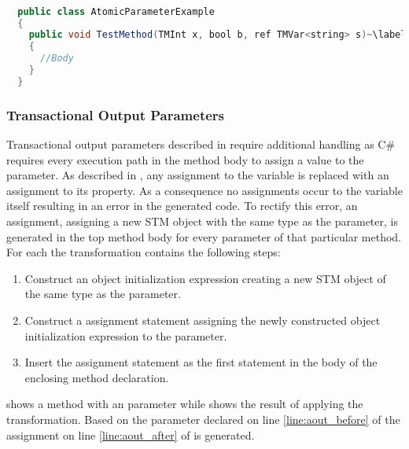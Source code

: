 \begin{lstlisting}[label=lst:after_atomic_parameter,
  caption={\bscode{atomic} Parameters After Transformation},
  language=Java,  
  showspaces=false,
  showtabs=false,
  breaklines=true,
  showstringspaces=false,
  breakatwhitespace=true,
  escapechar=~,
  commentstyle=\color{greencomments},
  keywordstyle=\color{bluekeywords},
  stringstyle=\color{redstrings},
  morekeywords={atomic, retry, orelse, var, get, set, ref}]  % Start your code-block

  public class AtomicParameterExample
  {
    public void TestMethod(TMInt x, bool b, ref TMVar<string> s)~\label{line:ap_after}~
    {
      //Body
    }
  }
\end{lstlisting}

\subsubsection{Transactional Output Parameters}
Transactional output parameters described in  require additional handling as C\# requires every execution path in the method body to assign a value to the parameter\cite[p. 42]{sestoft2011c}. As described in , any assignment to the variable is replaced with an assignment to its  property. As a consequence no assignments occur to the variable itself resulting in an error in the generated code. To rectify this error, an assignment, assigning a new \ac{STM} object with the same type as the parameter, is generated in the top method body for every  parameter of that particular method. For each  the \stmnamesp transformation contains the following steps:

\begin{enumerate}
	\item Construct an object initialization expression creating a new \ac{STM} object of the same type as the parameter.
	\item Construct a assignment statement assigning the newly constructed object initialization expression to the  parameter.
	\item Insert the assignment statement as the first statement in the body of the enclosing method declaration.
\end{enumerate}

 shows a method with an  parameter while  shows the result of applying the transformation.
Based on the  parameter declared on line \ref{line:aout_before} of  the assignment on line \ref{line:aout_after} of  is generated.

